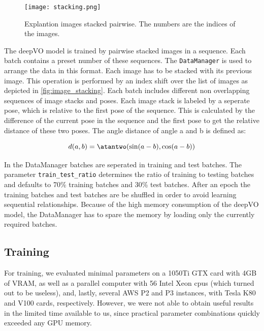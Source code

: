 \documentclass[a4paper,11pt]{article}
\begin{document}
\begin{figure}[tbh]
    \centering
    \texttt{[image: stacking.png]}
    \caption{Explantion images stacked pairwise. The numbers are the indices of the images.}
    \label{fig:image_stacking}
\end{figure}
The deepVO model is trained by pairwise stacked images in a sequence. Each batch contains a preset number of these sequences. The \texttt{DataManager} is used to arrange the data in this format. Each image has to be stacked with its previous image. This operation is performed by an index shift over the list of images as depicted in \autoref{fig:image_stacking}. Each batch includes different non overlapping sequences of image stacks and
poses. Each image stack is labeled by a seperate pose, which is relative to the
first pose of the sequence.
This is calculated by the difference of the current pose in the sequence and the first pose to get the relative distance of these two poses. The angle distance of angle a and b is defined as:

\begin{equation}
 d(a,b) = \atantwo(\sin(a-b), \cos(a-b))
\end{equation}

In the DataManager batches are seperated in training and test batches. The
parameter \texttt{train\_test\_ratio} determines the ratio of training to testing
batches and defaults to 70\% training batches and 30\% test batches. After an
epoch the training batches and test batches are be shuffled in order to avoid learning
sequential relationships. Because of the high memory consumption of the deepVO model,
the DataManager has to spare the memory by loading only the currently required batches.


\subsection{Training}
\label{sec:evaluation:training}

For training, we evaluated minimal parameters on a 1050Ti GTX card with 4GB of
VRAM, as well as a parallel computer with 56 Intel Xeon cpus (which turned out
to be useless), and, lastly, several AWS P2 and P3 instances, with Tesla K80 and
V100 cards, respectively. However, we were not able to obtain useful results in
the limited time available to us, since practical parameter combinations quickly
exceeded any GPU memory.
\end{document}
